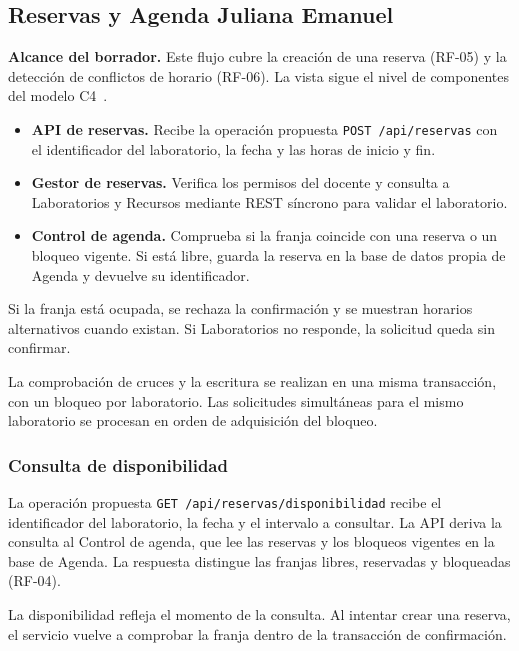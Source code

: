 \subsection{Reservas y Agenda \hfill Juliana Emanuel}

\textbf{Alcance del borrador.} Este flujo cubre la creación de una reserva
(RF-05) y la detección de conflictos de horario (RF-06).
La vista sigue el nivel de componentes del modelo C4~\cite{brownC4Componentes}.

\begin{itemize}
  \item \textbf{API de reservas.} Recibe la operación propuesta
    \texttt{POST /api/reservas} con el identificador del laboratorio,
    la fecha y las horas de inicio y fin.
  \item \textbf{Gestor de reservas.} Verifica los permisos del docente
    y consulta a Laboratorios y Recursos mediante REST síncrono para
    validar el laboratorio.
  \item \textbf{Control de agenda.} Comprueba si la franja coincide con
    una reserva o un bloqueo vigente. Si está libre, guarda la reserva
    en la base de datos propia de Agenda y devuelve su identificador.
\end{itemize}

Si la franja está ocupada, se rechaza la confirmación y se muestran
horarios alternativos cuando existan. Si Laboratorios no responde,
la solicitud queda sin confirmar.

La comprobación de cruces y la escritura se realizan en una misma
transacción, con un bloqueo por laboratorio. Las solicitudes simultáneas
para el mismo laboratorio se procesan en orden de adquisición del bloqueo.

\subsubsection{Consulta de disponibilidad}

La operación propuesta \texttt{GET /api/reservas/disponibilidad} recibe
el identificador del laboratorio, la fecha y el intervalo a consultar.
La API deriva la consulta al Control de agenda, que lee las reservas y
los bloqueos vigentes en la base de Agenda. La respuesta distingue las
franjas libres, reservadas y bloqueadas (RF-04).

La disponibilidad refleja el momento de la consulta. Al intentar crear
una reserva, el servicio vuelve a comprobar la franja dentro de la
transacción de confirmación.
